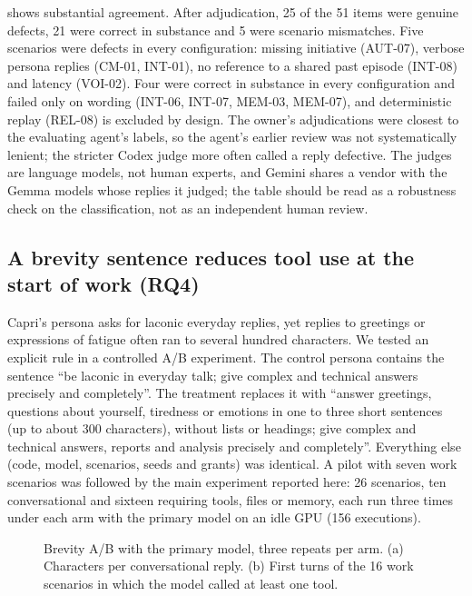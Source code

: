 \documentclass[11pt,a4paper]{article}
\begin{document}
 shows substantial agreement. After adjudication, 25 of the 51 items were genuine defects, 21 were correct in substance and 5 were scenario mismatches. Five scenarios were defects in every configuration: missing initiative (AUT-07), verbose persona replies (CM-01, INT-01), no reference to a shared past episode (INT-08) and latency (VOI-02). Four were correct in substance in every configuration and failed only on wording (INT-06, INT-07, MEM-03, MEM-07), and deterministic replay (REL-08) is excluded by design. The owner's adjudications were closest to the evaluating agent's labels, so the agent's earlier review was not systematically lenient; the stricter Codex judge more often called a reply defective. The judges are language models, not human experts, and Gemini shares a vendor with the Gemma models whose replies it judged; the table should be read as a robustness check on the classification, not as an independent human review.

\subsection{A brevity sentence reduces tool use at the start of work (RQ4)}\label{sec:brevity}
Capri's persona asks for laconic everyday replies, yet replies to greetings or expressions of fatigue often ran to several hundred characters. We tested an explicit rule in a controlled A/B experiment. The control persona contains the sentence ``be laconic in everyday talk; give complex and technical answers precisely and completely''. The treatment replaces it with ``answer greetings, questions about yourself, tiredness or emotions in one to three short sentences (up to about 300 characters), without lists or headings; give complex and technical answers, reports and analysis precisely and completely''. Everything else (code, model, scenarios, seeds and grants) was identical. A pilot with seven work scenarios was followed by the main experiment reported here: 26 scenarios, ten conversational and sixteen requiring tools, files or memory, each run three times under each arm with the primary model on an idle GPU (156 executions).

\begin{figure}[tbp]\centering
\caption{Brevity A/B with the primary model, three repeats per arm. (a) Characters per conversational reply. (b) First turns of the 16 work scenarios in which the model called at least one tool.}\label{fig:brevity}\end{figure}
\end{document}
